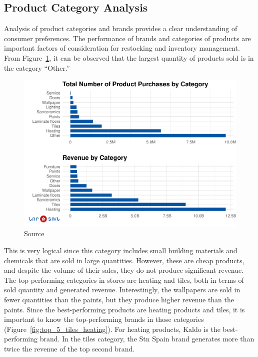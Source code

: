 \documentclass[conference]{IEEEtran}
\begin{document}

\subsection{Product Category Analysis}
Analysis of product categories and brands provides a clear understanding of consumer preferences. The performance of brands and categories of products are important factors of consideration for restocking and inventory management. From Figure~\ref{fig:number_revenue_comparison}, it can be observed that the largest quantity of products sold is in the category ``Other.'' 
\begin{figure}[htbp]
\centering
\includegraphics[width=\columnwidth,keepaspectratio]{./figures/revenue_quantity_comparison_by_category.pdf}
\caption{Source \cite{Categorygraph}}
\label{fig:number_revenue_comparison}
\end{figure}
This is very logical since this category includes small building materials and chemicals that are sold in large quantities. However, these are cheap products, and despite the volume of their sales, they do not produce significant revenue. The top performing categories in stores are heating and tiles, both in terms of sold quantity and generated revenue. Interestingly, the wallpapers are sold in fewer quantities than the paints, but they produce higher revenue than the paints. Since the best-performing products are heating products and tiles, it is important to know the top-performing brands in those categories (Figure~\ref{fig:top_5_tiles_heating}). For heating products, Kaldo is the best-performing brand. In the tiles category, the Stn Spain brand generates more than twice the revenue of the top second brand.
\end{document}
